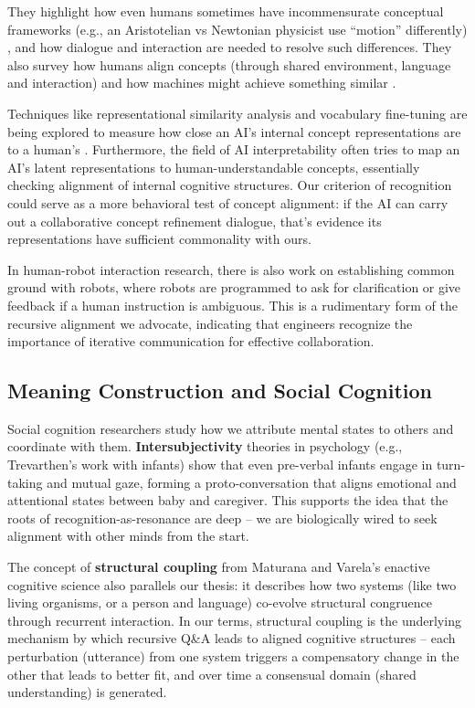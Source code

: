\documentclass{article}
\begin{document}
They highlight how even humans sometimes have incommensurate conceptual frameworks (e.g., an Aristotelian vs Newtonian physicist use ``motion'' differently) \citep{rane2024}, and how dialogue and interaction are needed to resolve such differences. They also survey how humans align concepts (through shared environment, language and interaction) and how machines might achieve something similar \citep{rane2024}.

Techniques like representational similarity analysis and vocabulary fine-tuning are being explored to measure how close an AI's internal concept representations are to a human's \citep{rane2024}. Furthermore, the field of AI interpretability often tries to map an AI's latent representations to human-understandable concepts, essentially checking alignment of internal cognitive structures. Our criterion of recognition could serve as a more behavioral test of concept alignment: if the AI can carry out a collaborative concept refinement dialogue, that's evidence its representations have sufficient commonality with ours.

In human-robot interaction research, there is also work on establishing common ground with robots, where robots are programmed to ask for clarification or give feedback if a human instruction is ambiguous. This is a rudimentary form of the recursive alignment we advocate, indicating that engineers recognize the importance of iterative communication for effective collaboration.

\subsection{Meaning Construction and Social Cognition}

Social cognition researchers study how we attribute mental states to others and coordinate with them. \textbf{Intersubjectivity} theories in psychology (e.g., Trevarthen's work with infants) show that even pre-verbal infants engage in turn-taking and mutual gaze, forming a proto-conversation that aligns emotional and attentional states between baby and caregiver. This supports the idea that the roots of recognition-as-resonance are deep -- we are biologically wired to seek alignment with other minds from the start.

The concept of \textbf{structural coupling} from Maturana and Varela's enactive cognitive science also parallels our thesis: it describes how two systems (like two living organisms, or a person and language) co-evolve structural congruence through recurrent interaction. In our terms, structural coupling is the underlying mechanism by which recursive Q\&A leads to aligned cognitive structures -- each perturbation (utterance) from one system triggers a compensatory change in the other that leads to better fit, and over time a consensual domain (shared understanding) is generated.
\end{document}
